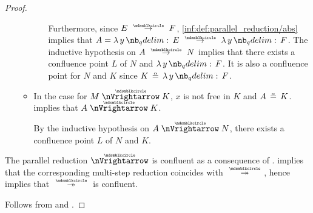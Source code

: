 \begin{proof}
\begin{itemize}
\begin{itemize}
\begin{itemize}
        Furthermore, since \( E \pred F \), \ref{inf:def:parallel_reduction/abs} implies that \( A = \qabs y E \pred \qabs y F \). The inductive hypothesis on \( A \pred N \) implies that there exists a confluence point \( L \) of \( N \) and \( \qabs y F \). It is also a confluence point for \( N \) and \( K \) since \( K \aequiv \qabs y F \).
      \end{itemize}

      \item In the case  for \( M \ppred K \), \( x \) is not free in \( K \) and \( A \aequiv K \).  implies that \( A \ppred K \).

      By the inductive hypothesis on \( A \ppred N \), there exists a confluence point \( L \) of \( N \) and \( K \).
    \end{itemize}
  \end{itemize}

   The parallel reduction \( {\ppred} \) is confluent as a consequence of .  implies that the corresponding multi-step reduction coincides with \( {\pred*} \), hence  implies that \( {\pred*} \) is confluent.

   Follows from  and .
\end{proof}
